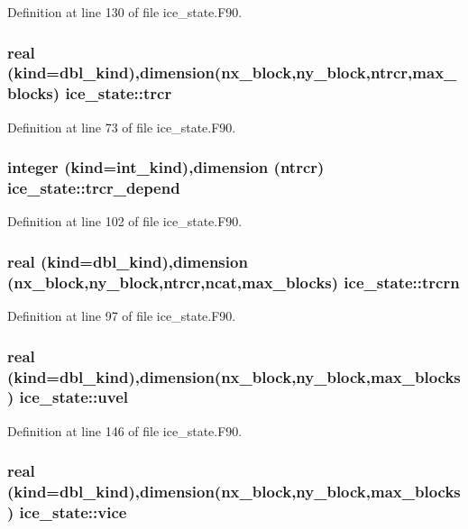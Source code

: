 Definition at line 130 of file ice\_\-state.F90.\hypertarget{namespaceice__state_ad9117b5d7f02ca8a6a10db8afa75a6ef}{
\subsubsection[{trcr}]{\setlength{\rightskip}{0pt plus 5cm}real (kind=dbl\_\-kind),dimension(nx\_\-block,ny\_\-block,ntrcr,max\_\-blocks) {\bf ice\_\-state::trcr}}}
\label{namespaceice__state_ad9117b5d7f02ca8a6a10db8afa75a6ef}


Definition at line 73 of file ice\_\-state.F90.\hypertarget{namespaceice__state_a1690af0ac3de6ba93723f9eeab0dfe3f}{
\subsubsection[{trcr\_\-depend}]{\setlength{\rightskip}{0pt plus 5cm}integer (kind=int\_\-kind),dimension (ntrcr) {\bf ice\_\-state::trcr\_\-depend}}}
\label{namespaceice__state_a1690af0ac3de6ba93723f9eeab0dfe3f}


Definition at line 102 of file ice\_\-state.F90.\hypertarget{namespaceice__state_a52d1c7e6719d1a295a7e5fab8b867dd1}{
\subsubsection[{trcrn}]{\setlength{\rightskip}{0pt plus 5cm}real (kind=dbl\_\-kind),dimension (nx\_\-block,ny\_\-block,ntrcr,ncat,max\_\-blocks) {\bf ice\_\-state::trcrn}}}
\label{namespaceice__state_a52d1c7e6719d1a295a7e5fab8b867dd1}


Definition at line 97 of file ice\_\-state.F90.\hypertarget{namespaceice__state_a74f862ad20a4ee9051006a6db77c4bc5}{
\subsubsection[{uvel}]{\setlength{\rightskip}{0pt plus 5cm}real (kind=dbl\_\-kind),dimension(nx\_\-block,ny\_\-block,max\_\-blocks) {\bf ice\_\-state::uvel}}}
\label{namespaceice__state_a74f862ad20a4ee9051006a6db77c4bc5}


Definition at line 146 of file ice\_\-state.F90.\hypertarget{namespaceice__state_a097435b3544c01705ca626cc43ee61b5}{
\subsubsection[{vice}]{\setlength{\rightskip}{0pt plus 5cm}real (kind=dbl\_\-kind),dimension(nx\_\-block,ny\_\-block,max\_\-blocks) {\bf ice\_\-state::vice}}}
\label{namespaceice__state_a097435b3544c01705ca626cc43ee61b5}


